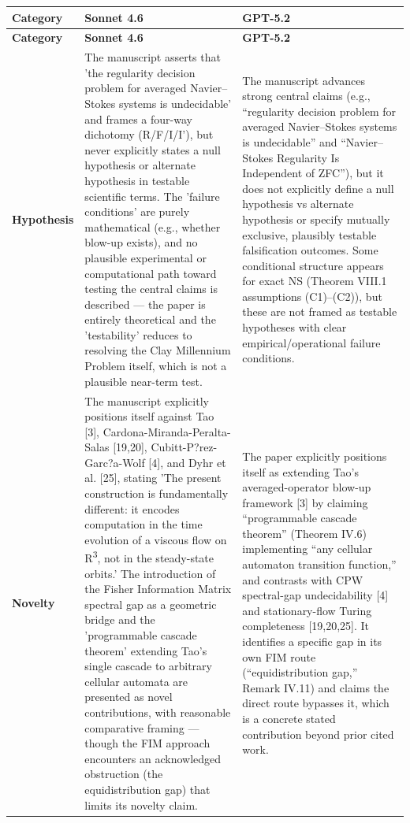 \documentclass[11pt]{article}
\begin{document}
\begin{longtable}{@{} p{2.2cm} p{6.3cm} p{6.3cm} @{}}
\toprule
\textbf{Category} & \textbf{Sonnet 4.6} & \textbf{GPT-5.2} \\
\midrule
\endfirsthead
\toprule
\textbf{Category} & \textbf{Sonnet 4.6} & \textbf{GPT-5.2} \\
\midrule
\endhead
\bottomrule
\endlastfoot

\rowcolor{rowgray}
\textbf{Hypothesis} &
The manuscript asserts that 'the regularity decision problem for averaged Navier--Stokes systems is undecidable' and frames a four-way dichotomy (R/F/I/I'), but never explicitly states a null hypothesis or alternate hypothesis in testable scientific terms. The 'failure conditions' are purely mathematical (e.g., whether blow-up exists), and no plausible experimental or computational path toward testing the central claims is described --- the paper is entirely theoretical and the 'testability' reduces to resolving the Clay Millennium Problem itself, which is not a plausible near-term test. &
The manuscript advances strong central claims (e.g., ``regularity decision problem for averaged Navier--Stokes systems is undecidable'' and ``Navier--Stokes Regularity Is Independent of ZFC''), but it does not explicitly define a null hypothesis vs alternate hypothesis or specify mutually exclusive, plausibly testable falsification outcomes. Some conditional structure appears for exact NS (Theorem VIII.1 assumptions (C1)--(C2)), but these are not framed as testable hypotheses with clear empirical/operational failure conditions. \\[6pt]

\textbf{Novelty} &
The manuscript explicitly positions itself against Tao [3], Cardona-Miranda-Peralta-Salas [19,20], Cubitt-P?rez-Garc?a-Wolf [4], and Dyhr et al. [25], stating 'The present construction is fundamentally different: it encodes computation in the time evolution of a viscous flow on R\textsuperscript{3}, not in the steady-state orbits.' The introduction of the Fisher Information Matrix spectral gap as a geometric bridge and the 'programmable cascade theorem' extending Tao's single cascade to arbitrary cellular automata are presented as novel contributions, with reasonable comparative framing --- though the FIM approach encounters an acknowledged obstruction (the equidistribution gap) that limits its novelty claim. &
The paper explicitly positions itself as extending Tao's averaged-operator blow-up framework [3] by claiming ``programmable cascade theorem'' (Theorem IV.6) implementing ``any cellular automaton transition function,'' and contrasts with CPW spectral-gap undecidability [4] and stationary-flow Turing completeness [19,20,25]. It identifies a specific gap in its own FIM route (``equidistribution gap,'' Remark IV.11) and claims the direct route bypasses it, which is a concrete stated contribution beyond prior cited work. \\[6pt]


\end{longtable}
\end{document}
